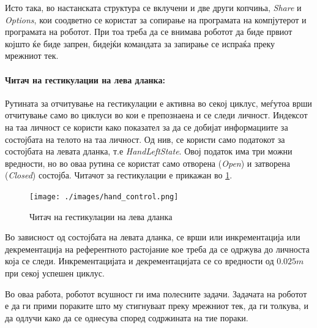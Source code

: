 \documentclass[11pt]{article}
\begin{document}
      Исто така, во настанската структура се вклучени и две други копчиња, \textit{Share} и \textit{Options}, кои соодветно се користат за сопирање на програмата на компјутерот и програмата на роботот. При тоа треба да се внимава роботот да биде првиот којшто ќе биде запрен, бидејќи командата за запирање се испраќа преку мрежниот тек.

    \paragraph{Читач на гестикулации на лева дланка:\\}
      Рутината за отчитување на гестикулации е активна во секој циклус, меѓутоа врши отчитување само во циклуси во кои е препознаена и се следи личност. Индексот на таа личност се користи како показател за да се добијат информациите за состојбата на телото на таа личност. Од нив, се користи само податокот за состојбата на левата дланка, т.е \textit{HandLeftState}. Овој податок има три можни вредности, но во оваа рутина се користат само отворена (\textit{Open}) и затворена (\textit{Closed}) состојба. Читачот за гестикулации е прикажан во \ref{fig:hand_control}.

      \begin{figure}[H]
        \centering
        \texttt{[image: ./images/hand\_control.png]}
        \caption{Читач на гестикулации на лева дланка}
        \label{fig:hand_control}
        \end{figure}

      Во зависност од состојбата на левата дланка, се врши или инкрементација или декрементација на референтното растојание кое треба да се одржува до личноста која се следи. Инкрементацијата и декрементацијата се со вредности од $0.025m$ при секој успешен циклус.

    \bigbreak

    Во оваа работа, роботот всушност ги има полесните задачи. Задачата на роботот е да ги прими пораките што му стигнуваат преку мрежниот тек, да ги толкува, и да одлучи како да се однесува според содржината на тие пораки.
\end{document}
